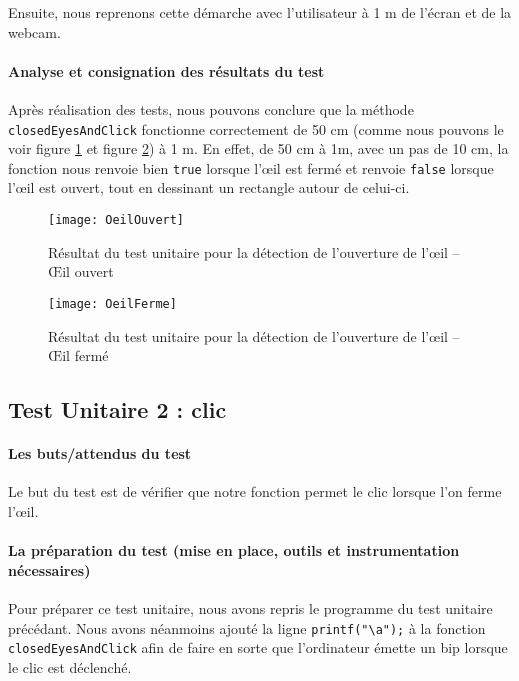 Ensuite, nous reprenons cette démarche avec l’utilisateur à 1 m de l’écran et de la webcam.

\paragraph{Analyse et consignation des résultats du test}

Après réalisation des tests, nous pouvons conclure que la méthode \lstinline=closedEyesAndClick= fonctionne correctement de 50 cm (comme nous pouvons le voir figure \ref{fig:OeilOuvert} et figure \ref{fig:OeilFerme}) à 1 m. En effet, de 50 cm à 1m, avec un pas de 10 cm, la fonction nous renvoie bien \lstinline=true= lorsque l’œil est fermé et renvoie \lstinline=false= lorsque l’œil est ouvert, tout en dessinant un rectangle autour de celui-ci.

\begin{figure}[H]
  \centering
  \texttt{[image: OeilOuvert]}
  \caption{Résultat du test unitaire pour la détection de l’ouverture de l’œil – Œil ouvert}
  \label{fig:OeilOuvert}
\end{figure}

\begin{figure}[H]
  \centering
  \texttt{[image: OeilFerme]}
  \caption{Résultat du test unitaire pour la détection de l’ouverture de l’œil – Œil fermé}
  \label{fig:OeilFerme}
\end{figure}

\subsection{Test Unitaire 2 : clic}

\paragraph{Les buts/attendus du test}

Le but du test est de vérifier que notre fonction permet le clic lorsque l’on ferme l’œil.

\paragraph{La préparation du test (mise en place, outils et instrumentation nécessaires)}

Pour préparer ce test unitaire, nous avons repris le programme du test unitaire précédant. Nous avons néanmoins ajouté la ligne \lstinline=printf("\a");= à la fonction \lstinline=closedEyesAndClick= afin de faire en sorte que l’ordinateur émette un bip lorsque le clic est déclenché.

